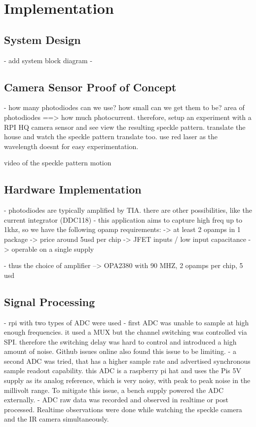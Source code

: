 \section{Implementation}
\label{sec:implementation}

\subsection{System Design}

- add system block diagram
- 

\subsection{Camera Sensor Proof of Concept}
- how many photodiodes can we use? how small can we get them to be? area of photodiodes ==> how much photocurrent. therefore, setup an experiment with a RPI HQ camera sensor and see view the resulting speckle pattern. 
translate the house and watch the speckle pattern translate too. use red laser as the wavelength doesnt for easy experimentation.

video of the speckle pattern motion

\subsection{Hardware Implementation}

- photodiodes are typically amplified by TIA. there are other possibilities, like the current integrator (DDC118)
- this application aims to capture high freq up to 1khz, so we have the following opamp requirements:
-> at least 2 opamps in 1 package
-> price around 5usd per chip
-> JFET inputs / low input capacitance
-> operable on a single supply

- thus the choice of amplifier --> OPA2380 with 90 MHZ, 2 opamps per chip, 5 usd

\subsection{Signal Processing}
- rpi with two types of ADC were used
- first ADC was unable to sample at high enough frequencies. it used a MUX but the channel switching was controlled via SPI. therefore the switching delay was hard to control and introduced a high amount of noise. Github issues online also found this issue to be limiting.
- a second ADC was tried, that has a higher sample rate and advertised synchronous sample readout capability. this ADC is a raspberry pi hat and uses the Pis 5V supply as its analog reference, which is very noisy, with peak to peak noise in the millivolt range. To mitigate this issue, a bench supply powered the ADC externally.
- ADC raw data was recorded and observed in realtime or post processed. Realtime observations were done while watching the speckle camera and the IR camera simultaneously.

